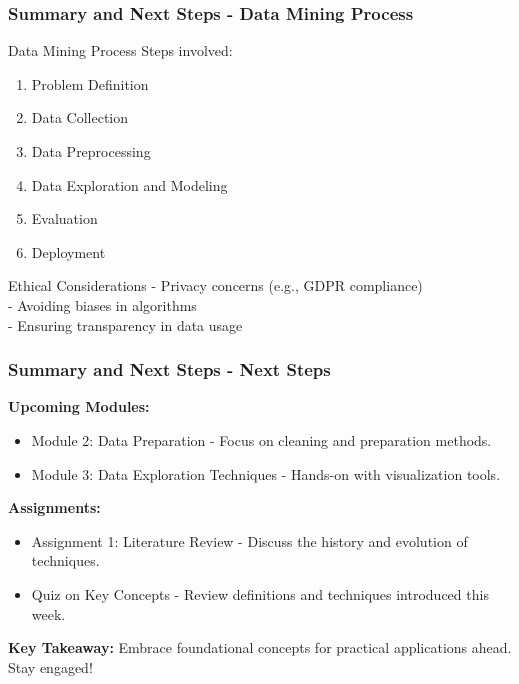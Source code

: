 \documentclass{beamer}
\begin{document}
\begin{frame}[fragile]
    \frametitle{Summary and Next Steps - Data Mining Process}
    
    \begin{block}{Data Mining Process}
        Steps involved:
        \begin{enumerate}
            \item Problem Definition
            \item Data Collection
            \item Data Preprocessing
            \item Data Exploration and Modeling
            \item Evaluation
            \item Deployment
        \end{enumerate}
    \end{block}
    
    \begin{block}{Ethical Considerations}
        - Privacy concerns (e.g., GDPR compliance)\\
        - Avoiding biases in algorithms\\
        - Ensuring transparency in data usage
    \end{block}
\end{frame}

\begin{frame}[fragile]
    \frametitle{Summary and Next Steps - Next Steps}
    
    \textbf{Upcoming Modules:}
    \begin{itemize}
        \item Module 2: Data Preparation - Focus on cleaning and preparation methods.
        \item Module 3: Data Exploration Techniques - Hands-on with visualization tools.
    \end{itemize}
    
    \textbf{Assignments:}
    \begin{itemize}
        \item Assignment 1: Literature Review - Discuss the history and evolution of techniques.
        \item Quiz on Key Concepts - Review definitions and techniques introduced this week.
    \end{itemize}
    
    \textbf{Key Takeaway:} Embrace foundational concepts for practical applications ahead. Stay engaged!
\end{frame}
\end{document}
